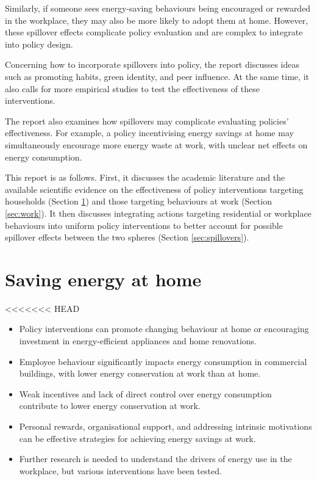 \documentclass[
  12pt,
  captions=heading]{scrreport}
\begin{document}
Similarly, if someone sees energy-saving behaviours being encouraged or
rewarded in the workplace, they may also be more likely to adopt them at
home. However, these spillover effects complicate policy evaluation and
are complex to integrate into policy design.

Concerning how to incorporate spillovers into policy, the report
discusses ideas such as promoting habits, green identity, and peer
influence. At the same time, it also calls for more empirical studies to
test the effectiveness of these interventions.

The report also examines how spillovers may complicate evaluating
policies' effectiveness. For example, a policy incentivising energy
savings at home may simultaneously encourage more energy waste at work,
with unclear net effects on energy consumption.

This report is as follows. First, it discusses the academic literature
and the available scientific evidence on the effectiveness of policy
interventions targeting households (Section \ref{sec:home}) and those
targeting behaviours at work (Section \ref{sec:work}). It then discusses
integrating actions targeting residential or workplace behaviours into
uniform policy interventions to better account for possible spillover
effects between the two spheres (Section \ref{sec:spillovers}).

\hypertarget{sec:home}{%
\chapter{Saving energy at home}\label{sec:home}}

<<<<<<< HEAD
\begin{keypoints}
\begin{itemize}[leftmargin=*,labelsep=5mm]
    \item Policy interventions can promote changing behaviour at home or encouraging investment in energy-efficient appliances and home renovations.
    \item Employee behaviour significantly impacts energy consumption in commercial buildings, with lower energy conservation at work than at home.
    \item Weak incentives and lack of direct control over energy consumption contribute to lower energy conservation at work.
    \item Personal rewards, organisational support, and addressing intrinsic motivations can be effective strategies for achieving energy savings at work.
    \item Further research is needed to understand the drivers of energy use in the workplace, but various interventions have been tested.
\end{itemize}
\end{keypoints}
\end{document}
